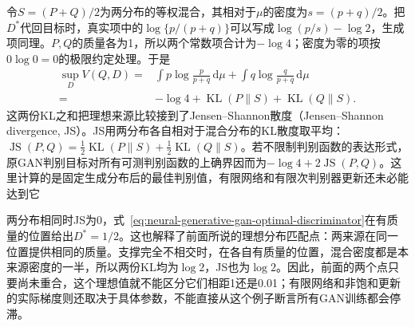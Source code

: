 令$S=(P+Q)/2$为两分布的等权混合，其相对于$\mu$的密度为$s=(p+q)/2$。把$D^*$代回目标时，真实项中的$\log\{p/(p+q)\}$可以写成$\log(p/s)-\log2$，生成项同理。$P,Q$的质量各为1，所以两个常数项合计为$-\log4$；密度为零的项按$0\log0=0$的极限约定处理。于是
\begin{equation}
  \label{eq:neural-generative-gan-js-value}
  \begin{aligned}
  \sup_D V(Q,D)
    ={}&\int p\log\frac{p}{p+q}\,\mathrm{d}\mu
       +\int q\log\frac{q}{p+q}\,\mathrm{d}\mu\\
    ={}&-\log4+\operatorname{KL}(P\|S)
       +\operatorname{KL}(Q\|S).
  \end{aligned}
\end{equation}
这两份KL之和把理想来源比较接到了Jensen--Shannon散度（Jensen--Shannon divergence, JS）。JS用两分布各自相对于混合分布的KL散度取平均：$\operatorname{JS}(P,Q)=\tfrac12\operatorname{KL}(P\|S)+\tfrac12\operatorname{KL}(Q\|S)$。若不限制判别函数的表达形式，原GAN判别目标对所有可测判别函数的上确界因而为$-\log4+2\operatorname{JS}(P,Q)$。这里计算的是固定生成分布后的最佳判别值，有限网络和有限次判别器更新还未必能达到它

两分布相同时JS为0，式~\eqref{eq:neural-generative-gan-optimal-discriminator}在有质量的位置给出$D^*=1/2$。这也解释了前面所说的理想分布匹配点：两来源在同一位置提供相同的质量。支撑完全不相交时，在各自有质量的位置，混合密度都是本来源密度的一半，所以两份KL均为$\log2$，JS也为$\log2$。因此，前面的两个点只要尚未重合，这个理想值就不能区分它们相距1还是0.01；有限网络和非饱和更新的实际梯度则还取决于具体参数，不能直接从这个例子断言所有GAN训练都会停滞。


